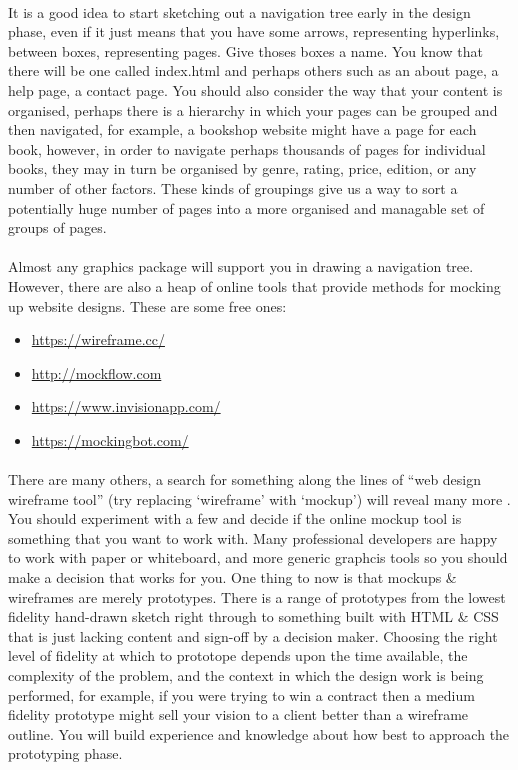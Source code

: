 \documentclass[10pt, a4paper, twosize]{article}
\begin{document}
\paragraph{} It is a good idea to start sketching out a navigation tree early in the design phase, even if it just means that you have some arrows, representing hyperlinks, between boxes, representing pages. Give thoses boxes a name. You know that there will be one called index.html and perhaps others such as an about page, a help page, a contact page. You should also consider the way that your content is organised, perhaps there is a hierarchy in which your pages can be grouped and then navigated, for example, a bookshop website might have a page for each book, however, in order to navigate perhaps thousands of pages for individual books, they may in turn be organised by genre, rating, price, edition, or any number of other factors. These kinds of groupings give us a way to sort a potentially huge number of pages into a more organised and managable set of groups of pages.


\paragraph{} Almost any graphics package will support you in drawing a navigation tree. However, there are also a heap of online tools that provide methods for mocking up website designs. These are some free ones:

\begin{itemize}
\item \url{https://wireframe.cc/}
\item \url{http://mockflow.com}
\item \url{https://www.invisionapp.com/}
\item \url{https://mockingbot.com/}
\end{itemize}

\paragraph{} There are many others, a search for something along the lines of ``web design wireframe tool'' (try replacing `wireframe' with `mockup') will reveal many more . You should experiment with a few and decide if the online mockup tool is something that you want to work with. Many professional developers are happy to work with paper or whiteboard, and more generic graphcis tools so you should make a decision that works for you. One thing to now is that mockups  \& wireframes are merely prototypes. There is a range of prototypes from the lowest fidelity hand-drawn sketch right through to something built with HTML \& CSS that is just lacking content and sign-off by a decision maker. Choosing the right level of fidelity at which to prototope depends upon the time available, the complexity of the problem, and the context in which the design work is being performed, for example, if you were trying to win a contract then a medium fidelity prototype might sell your vision to a client better than a wireframe outline. You will build experience and knowledge about how best to approach the prototyping phase.
\end{document}

